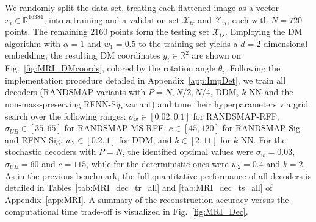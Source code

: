 \documentclass{article}
\begin{document}
We randomly split the data set, treating each flattened image as a vector $x_i\in \mathbb{R}^{16384}$, into a training and a validation set $\mathcal{X}_{tr}$ and $\mathcal{X}_{vl}$, each with $N = 720$ points. The remaining $2160$ points form the testing set $\mathcal{X}_{ts}$. Employing the DM algorithm with $\alpha=1$ and $w_1=0.5$ to the training set yields a $d=2$-dimensional embedding; the resulting DM coordinates $y_i\in \mathbb{R}^2$ are shown on Fig.~\ref{fig:MRI_DMcoords}, colored by the rotation angle $\theta_i$. Following the implementation procedure detailed in Appendix~\ref{app:ImpDet}, we train all decoders (RANDSMAP variants with $P=N, N/2, N/4$, DDM, $k$-NN and the non-mass-preserving RFNN-Sig variant) and tune their hyperparameters via grid search over the following ranges: $\sigma_w\in[0.02,0.1]$ for RANDSMAP-RFF, $\sigma_{UB}\in[35,65]$ for RANDSMAP-MS-RFF, $c\in[45,120]$ for RANDSMAP-Sig and RFNN-Sig, $w_2\in[0.2,1]$ for DDM, and $k\in[2,11]$ for $k$-NN. For the stochastic decoders with $P=N$, the identified optimal values were $\sigma_w=0.03$, $\sigma_{UB}=60$ and $c=115$, while for the deterministic ones were $w_2=0.4$ and $k=2$.  
As in the previous benchmark, the full quantitative performance of all decoders is detailed in Tables~\ref{tab:MRI_dec_tr_all} and \ref{tab:MRI_dec_ts_all} of Appendix~\ref{app:MRI}. A summary of the reconstruction accuracy versus the computational time trade-off is visualized in Fig.~\ref{fig:MRI_Dec}.
\end{document}

